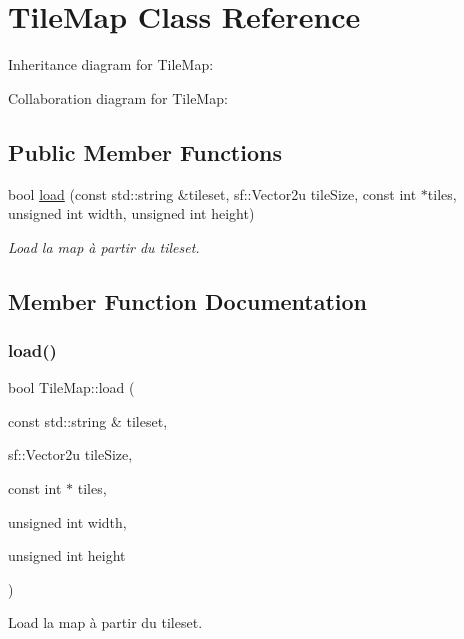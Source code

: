 \hypertarget{classTileMap}{}\section{Tile\+Map Class Reference}
\label{classTileMap}


Inheritance diagram for Tile\+Map\+:


Collaboration diagram for Tile\+Map\+:
\subsection*{Public Member Functions}
\begin{DoxyCompactItemize}
\item 
bool \hyperlink{classTileMap_a5bc3325e2382599c3f986ac64481e832}{load} (const std\+::string \&tileset, sf\+::\+Vector2u tile\+Size, const int $\ast$tiles, unsigned int width, unsigned int height)
\begin{DoxyCompactList}\small\item\em Load la map à partir du tileset. \end{DoxyCompactList}\end{DoxyCompactItemize}


\subsection{Member Function Documentation}
\mbox{\label{classTileMap_a5bc3325e2382599c3f986ac64481e832}} 
\subsubsection{\texorpdfstring{load()}{load()}}
{\footnotesize\ttfamily bool Tile\+Map\+::load (\begin{DoxyParamCaption}\item[{const std\+::string \&}]{tileset,  }\item[{sf\+::\+Vector2u}]{tile\+Size,  }\item[{const int $\ast$}]{tiles,  }\item[{unsigned int}]{width,  }\item[{unsigned int}]{height }\end{DoxyParamCaption})}



Load la map à partir du tileset. 


